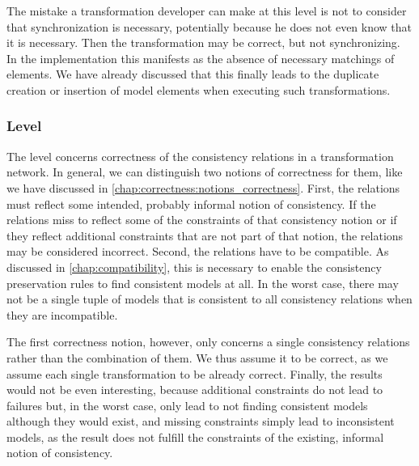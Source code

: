 The mistake a transformation developer can make at this level is not to consider that synchronization is necessary, potentially because he does not even know that it is necessary. Then the transformation may be correct, but not synchronizing.
In the implementation this manifests as the absence of necessary matchings of elements.
We have already discussed that this finally leads to the duplicate creation or insertion of model elements when executing such transformations.


\subsubsection*{\LevelNetworkRelation Level}

The \levelnetworkrelation level concerns correctness of the consistency relations in a transformation network.
In general, we can distinguish two notions of correctness for them, like we have discussed in \autoref{chap:correctness:notions_correctness}.
First, the relations must reflect some intended, probably informal notion of consistency.
If the relations miss to reflect some of the constraints of that consistency notion or if they reflect additional constraints that are not part of that notion, the relations may be considered incorrect.
Second, the relations have to be compatible.
As discussed in \autoref{chap:compatibility}, this is necessary to enable the consistency preservation rules to find consistent models at all.
In the worst case, there may not be a single tuple of models that is consistent to all consistency relations when they are incompatible.

The first correctness notion, however, only concerns a single consistency relations rather than the combination of them.
We thus assume it to be correct, as we assume each single transformation to be already correct.
Finally, the results would not be even interesting, because additional constraints do not lead to failures but, in the worst case, only lead to not finding consistent models although they would exist, and missing constraints simply lead to inconsistent models, as the result does not fulfill the constraints of the existing, informal notion of consistency.

